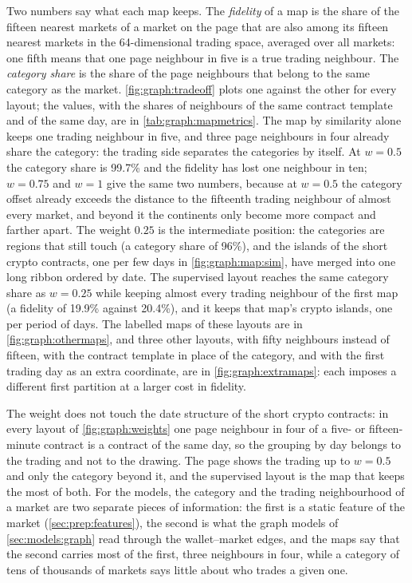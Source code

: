 Two numbers say what each map keeps.  The \emph{fidelity} of a map is the share of the
fifteen nearest markets of a market on the page that are also among its fifteen nearest
markets in the 64-dimensional trading space, averaged over all markets: one fifth means
that one page neighbour in five is a true trading neighbour.  The \emph{category share}
is the share of the page neighbours that belong to the same category as the market.
\cref{fig:graph:tradeoff} plots one against the other for every layout; the values, with
the shares of neighbours of the same contract template and of the same day, are in
\cref{tab:graph:mapmetrics}.  The map by similarity alone keeps one trading neighbour in
five, and three page neighbours in four already share the category: the trading side
separates the categories by itself.  At $w = 0.5$ the category share is 99.7\% and the
fidelity has lost one neighbour in ten; $w = 0.75$ and $w = 1$ give the same two numbers,
because at $w = 0.5$ the category offset already exceeds the distance to the fifteenth
trading neighbour of almost every market, and beyond it the continents only become more
compact and farther apart.  The weight $0.25$ is the intermediate position: the categories
are regions that still touch (a category share of 96\%), and the islands of the short
crypto contracts, one per few days in \cref{fig:graph:map:sim}, have merged into one long
ribbon ordered by date.  The supervised layout reaches the same category share as
$w = 0.25$ while keeping almost every trading neighbour of the first map (a fidelity of
19.9\% against 20.4\%), and it keeps that map's crypto islands, one per period of days.
The labelled maps of these layouts are in \cref{fig:graph:othermaps}, and three other
layouts, with fifty neighbours instead of fifteen, with the contract template in place of
the category, and with the first trading day as an extra coordinate, are in
\cref{fig:graph:extramaps}: each imposes a different first partition at a larger cost in
fidelity.

The weight does not touch the date structure of the short crypto contracts: in every
layout of \cref{fig:graph:weights} one page neighbour in four of a five- or fifteen-minute contract is a contract of
the same day, so the grouping by day belongs to the trading and not to the drawing.  The
page shows the trading up to $w = 0.5$ and only the category beyond it, and the supervised
layout is the map that keeps the most of both.  For the models, the category and the
trading neighbourhood of a market are two separate pieces of information: the first is a
static feature of the market (\cref{sec:prep:features}), the second is what the graph
models of \cref{sec:models:graph} read through the wallet--market edges, and the maps say
that the second carries most of the first, three neighbours in four, while a category of
tens of thousands of markets says little about who trades a given one.

